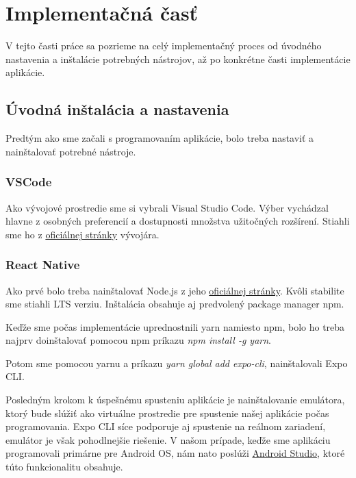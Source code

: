 
\section{Implementačná časť}
V tejto časti práce sa pozrieme na celý implementačný proces od úvodného nastavenia a inštalácie potrebných nástrojov, až po konkrétne časti implementácie aplikácie.

\subsection{Úvodná inštalácia a nastavenia}
Predtým ako sme začali s programovaním aplikácie, bolo treba nastaviť a nainštalovať potrebné nástroje.
\subsubsection{VSCode}
Ako vývojové prostredie sme si vybrali Visual Studio Code. Výber vychádzal hlavne z osobných preferencií a dostupnosti množstva užitočných rozšírení. Stiahli sme ho z \href{https://code.visualstudio.com/download}{oficiálnej stránky} vývojára.
\subsubsection{React Native}
\begin{itemize}
{\item Ako prvé bolo treba nainštalovať Node.js z jeho \href{https://nodejs.org/en/download/}{oficiálnej stránky}. Kvôli stabilite sme stiahli LTS verziu. Inštalácia obsahuje aj predvolený package manager npm.} 
{\item Keďže sme počas implementácie uprednostnili yarn namiesto npm, bolo ho treba najprv doinštalovať pomocou npm príkazu \textit{npm install -g yarn}.} 
{\item Potom sme pomocou yarnu a príkazu \textit{yarn global add expo-cli}, nainštalovali Expo CLI.} 
{\item Posledným krokom k úspešnému spusteniu aplikácie je nainštalovanie emulátora, ktorý bude slúžiť ako virtuálne prostredie pre spustenie našej aplikácie počas programovania. Expo CLI síce podporuje aj spustenie na reálnom zariadení, emulátor je však pohodlnejšie riešenie. V našom prípade, keďže sme aplikáciu programovali primárne pre Android OS, nám nato poslúži \href{https://developer.android.com/studio}{Android Studio}, ktoré túto funkcionalitu obsahuje.}
\end{itemize}

